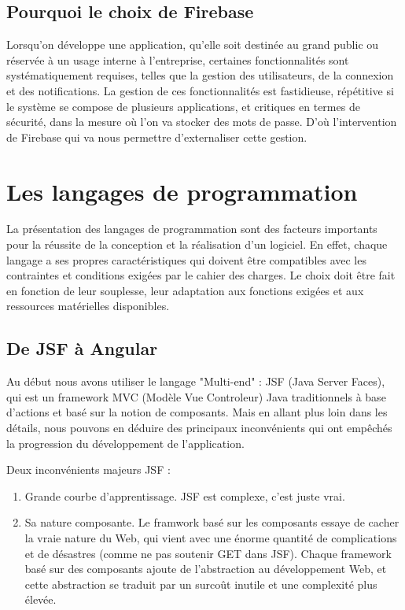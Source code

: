 \subsection{Pourquoi le choix de Firebase}
Lorsqu'on développe une application, qu'elle soit destinée au grand public ou réservée à un usage interne à l'entreprise, certaines fonctionnalités sont systématiquement requises, telles que la gestion des utilisateurs, de la connexion et des notifications. La gestion de ces fonctionnalités est fastidieuse, répétitive si le système se compose de plusieurs applications, et critiques en termes de sécurité, dans la mesure où l'on va stocker des mots de passe. D'où l'intervention de Firebase qui va nous permettre d'externaliser cette gestion.

\section{Les langages de programmation}
La présentation des langages de programmation sont des facteurs importants pour la réussite de la conception et la réalisation d'un logiciel. En effet, chaque langage a ses propres caractéristiques qui doivent être compatibles avec les contraintes et conditions exigées par le cahier des charges. Le choix doit être fait en fonction de leur souplesse, leur adaptation aux fonctions exigées et aux ressources matérielles disponibles.

\subsection{De JSF à Angular}
Au début nous avons utiliser le langage "Multi-end" : JSF (Java Server Faces), qui est un framework MVC (Modèle Vue Controleur) Java traditionnels à base d'actions et basé sur la notion de composants. Mais en allant plus loin dans les détails, nous pouvons en déduire des principaux inconvénients qui ont empêchés la progression du développement de l'application.
\medskip

Deux inconvénients majeurs JSF : 

\begin{enumerate}
	\item Grande courbe d'apprentissage. JSF est complexe, c'est juste vrai.
	\item Sa nature composante. Le framwork basé sur les composants essaye de cacher la vraie nature du Web, qui vient avec une énorme quantité de complications et de désastres (comme ne pas soutenir GET dans JSF). Chaque framework basé sur des composants ajoute de l'abstraction au développement Web, et cette abstraction se traduit par un surcoût inutile et une complexité plus élevée.
\end{enumerate}

